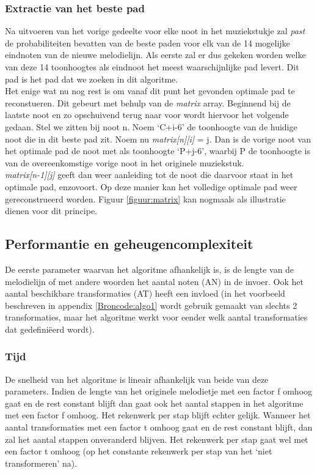 \subsubsection{Extractie van het beste pad}
Na uitvoeren van het vorige gedeelte voor elke noot in het muziekstukje zal \textit{past} de probabiliteiten bevatten van de beste paden voor elk van de 14 mogelijke eindnoten van de nieuwe melodielijn. Als eerste zal er dus gekeken worden welke van deze 14 toonhoogtes als eindnoot het meest waarschijnlijke pad levert. Dit pad is het pad dat we zoeken in dit algoritme.\\ 
Het enige wat nu nog rest is om vanaf dit punt het gevonden optimale pad te reconstueren. Dit gebeurt met behulp van de \textit{matrix} array. Beginnend bij de laatste noot en zo opschuivend terug naar voor wordt hiervoor het volgende gedaan. Stel we zitten bij noot n. Noem `C+i-6' de toonhoogte van de huidige noot die in dit beste pad zit. Noem nu \textit{matrix[n][i]} = j. Dan is de vorige noot van het optimale pad de noot met als toonhoogte `P+j-6', waarbij P de toonhoogte is van de overeenkomstige vorige noot in het originele muziekstuk.\\ \textit{matrix[n-1][j]} geeft dan weer aanleiding tot de noot die daarvoor staat in het optimale pad, enzovoort. Op deze manier kan het volledige optimale pad weer gereconstrueerd worden. Figuur \ref{figuur:matrix} kan nogmaals als illustratie dienen voor dit principe.

\subsection{Performantie en geheugencomplexiteit}
De eerste parameter waarvan het algoritme afhankelijk is, is de lengte van de melodielijn of met andere woorden het aantal noten (AN) in de invoer. Ook het aantal beschikbare transformaties (AT) heeft een invloed (in het voorbeeld beschreven in appendix \ref{Broncode:algo1} wordt gebruik gemaakt van slechts 2 transformaties, maar het algoritme werkt voor eender welk aantal transformaties dat gedefini\"eerd wordt).

\subsubsection{Tijd} 
De snelheid van het algoritme is lineair afhankelijk van beide van deze parameters. Indien de lengte van het originele melodietje met een factor f omhoog gaat en de rest constant blijft dan gaat ook het aantal stappen in het algoritme met een factor f omhoog. Het rekenwerk per stap blijft echter gelijk. Wanneer het aantal transformaties met een factor t omhoog gaat en de rest constant blijft, dan zal het aantal stappen onveranderd blijven. Het rekenwerk per stap gaat wel met een factor t omhoog (op het constante rekenwerk per stap van het `niet transformeren' na).

